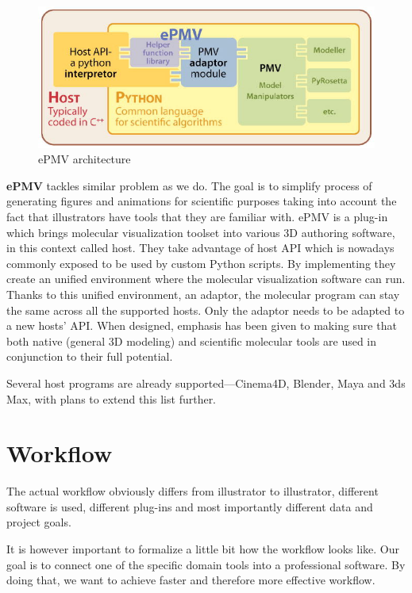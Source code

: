 \documentclass[
  digital, %
  table,   %
  nolof,     %
  nolot,     %
]{fithesis3}
\begin{document}
\begin{figure}
  \centering
  \includegraphics{images/epmv-architecture.jpg}
  \caption{ePMV architecture}
  \label{fig:ePMV}
\end{figure}
\textbf{ePMV}\cite{ePMV} tackles similar problem as we do. The goal is to simplify process of generating figures and animations for scientific purposes taking into account the fact that illustrators have tools that they are familiar with. ePMV is a plug-in which brings molecular visualization toolset into various 3D authoring software, in this context called host. They take advantage of host API which is nowadays commonly exposed to be used by custom Python scripts. By implementing they create an unified environment where the molecular visualization software can run. Thanks to this unified environment, an adaptor, the molecular program can stay the same across all the supported hosts. Only the adaptor needs to be adapted to a new hosts' API. When designed, emphasis has been given to making sure that both native (general 3D modeling) and scientific molecular tools are used in conjunction to their full potential.

Several host programs are already supported—Cinema4D, Blender, Maya and 3ds Max, with plans to extend this list further.

\section{Workflow}
The actual workflow obviously differs from illustrator to illustrator, different software is used, different plug-ins and most importantly different data and project goals.

It is however important to formalize a little bit how the workflow looks like. Our goal is to connect one of the specific domain tools into a professional software. By doing that, we want to achieve faster and therefore more effective workflow.
\end{document}
